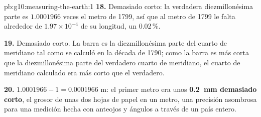 \begin{solution}{pb:g10:measuring-the-earth:1}
\textbf{18.} Demasiado corto: la verdadera diezmillonésima parte es
$1.0001966$ veces el metro de 1799, así que al metro de 1799 le falta
alrededor de $1.97 \times 10^{-4}$ de su longitud, un 0.02\,\%.

\textbf{19.} Demasiado corto. La barra es la diezmillonésima parte del
cuarto de meridiano tal como se calculó en la década de 1790; como la barra
es más corta que la diezmillonésima parte del verdadero cuarto de meridiano,
el cuarto de meridiano calculado era más corto que el verdadero.

\textbf{20.} $1.0001966 - 1 = 0.0001966$ m: el primer metro era unos
\textbf{\qty{0.2}{mm} demasiado corto}, el grosor de unas dos hojas de papel
en un metro, una precisión asombrosa para una medición hecha con anteojos y
ángulos a través de un país entero.
\end{solution}
